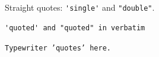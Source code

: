 \documentclass{article}
\begin{document}
Straight quotes: \verb|'single'| and \verb|"double"|.
\begin{verbatim}
'quoted' and "quoted" in verbatim
\end{verbatim}
\texttt{Typewriter 'quotes' here.}
\end{document}
